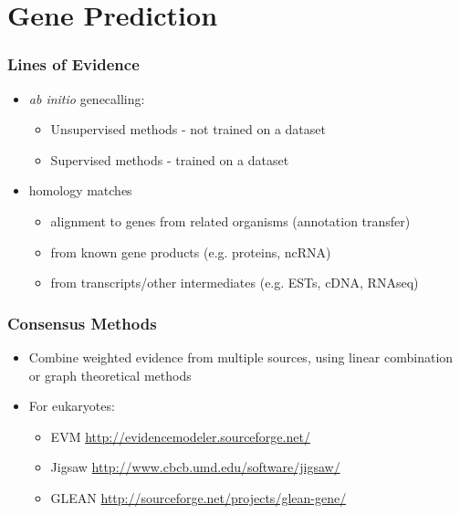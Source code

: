 \documentclass[table]{beamer}
\begin{document}
  \section{Gene Prediction}
    \begin{frame}
     \frametitle{Lines of Evidence}
     \begin{itemize}
       \item \textit{ab initio} genecalling: 
       \begin{itemize}
         \item Unsupervised methods - not trained on a dataset
         \item Supervised methods - trained on a dataset
       \end{itemize}
       \item homology matches
       \begin{itemize}
         \item alignment to genes from related organisms (annotation transfer)
         \item from known gene products (e.g. proteins, ncRNA)
         \item from transcripts/other intermediates (e.g. ESTs, cDNA, RNAseq)
       \end{itemize}
     \end{itemize}
    \end{frame}    
    
    \begin{frame}
     \frametitle{Consensus Methods}
     \begin{itemize}
       \item Combine weighted evidence from multiple sources, using linear combination or graph theoretical methods
       \item For eukaryotes:
       \begin{itemize}
         \item EVM \url{http://evidencemodeler.sourceforge.net/}
         \item Jigsaw \url{http://www.cbcb.umd.edu/software/jigsaw/}
         \item GLEAN \url{http://sourceforge.net/projects/glean-gene/}
       \end{itemize}
     \end{itemize}
    \end{frame}      
  
\end{document}
